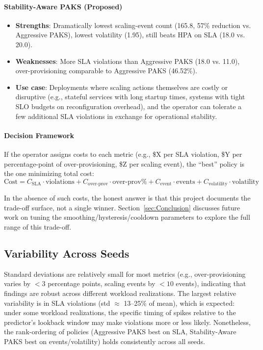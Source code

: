 \paragraph{Stability-Aware PAKS (Proposed)}
\begin{itemize}
  \item \textbf{Strengths}: Dramatically lowest scaling-event count (165.8, 57\% reduction vs. Aggressive PAKS), lowest volatility (1.95), still beats HPA on SLA (18.0 vs. 20.0).
  \item \textbf{Weaknesses}: More SLA violations than Aggressive PAKS (18.0 vs. 11.0), over-provisioning comparable to Aggressive PAKS (46.52\%).
  \item \textbf{Use case}: Deployments where scaling actions themselves are costly or disruptive (e.g., stateful services with long startup times, systems with tight SLO budgets on reconfiguration overhead), and the operator can tolerate a few additional SLA violations in exchange for operational stability.
\end{itemize}

\paragraph{Decision Framework}
If the operator assigns costs to each metric (e.g., \$X per SLA violation, \$Y per percentage-point of over-provisioning, \$Z per scaling event), the ``best'' policy is the one minimizing total cost:
\[
\text{Cost} = C_{\text{SLA}} \cdot \text{violations} + C_{\text{over-prov}} \cdot \text{over-prov\%} + C_{\text{event}} \cdot \text{events} + C_{\text{volatility}} \cdot \text{volatility}
\]

In the absence of such costs, the honest answer is that this project documents the trade-off surface, not a single winner. Section~\ref{sec:Conclusion} discusses future work on tuning the smoothing/hysteresis/cooldown parameters to explore the full range of this trade-off.

\subsection{Variability Across Seeds}
\label{sec:variability}

Standard deviations are relatively small for most metrics (e.g., over-provisioning varies by $<3$ percentage points, scaling events by $<10$ events), indicating that findings are robust across different workload realizations. The largest relative variability is in SLA violations (std $\approx$ 13--25\% of mean), which is expected: under some workload realizations, the specific timing of spikes relative to the predictor's lookback window may make violations more or less likely. Nonetheless, the rank-ordering of policies (Aggressive PAKS best on SLA, Stability-Aware PAKS best on events/volatility) holds consistently across all seeds.

